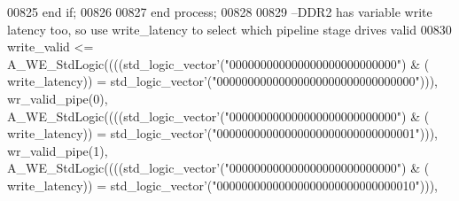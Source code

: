 \begin{DoxyCode}
00825     \textcolor{keywordflow}{end} \textcolor{keywordflow}{if};
00826 
00827   \textcolor{keywordflow}{end} \textcolor{keywordflow}{process};
00828 
00829 \textcolor{keyword}{  --DDR2 has variable write latency too, so use write\_latency to select which pipeline stage drives valid}
00830   \textcolor{vhdlchar}{write_valid} \textcolor{vhdlchar}{<=} \textcolor{vhdlchar}{A\_WE\_StdLogic}\textcolor{vhdlchar}{(}\textcolor{vhdlchar}{(}\textcolor{vhdlchar}{(}\textcolor{vhdlchar}{(}\textcolor{comment}{std\_logic\_vector}\textcolor{vhdlchar}{'}\textcolor{vhdlchar}{(}\textcolor{vhdllogic}{"000000000000000000000000000"}\textcolor{vhdlchar}{)} \textcolor{vhdlchar}{&} \textcolor{vhdlchar}{(}\textcolor{vhdlchar}{
      write_latency}\textcolor{vhdlchar}{)}\textcolor{vhdlchar}{)} \textcolor{vhdlchar}{=} \textcolor{comment}{std\_logic\_vector}\textcolor{vhdlchar}{'}\textcolor{vhdlchar}{(}\textcolor{vhdllogic}{"00000000000000000000000000000000"}\textcolor{vhdlchar}{)}\textcolor{vhdlchar}{)}\textcolor{vhdlchar}{)}\textcolor{vhdlchar}{,} \textcolor{vhdlchar}{
      wr_valid_pipe}\textcolor{vhdlchar}{(}\textcolor{vhdllogic}{}\textcolor{vhdllogic}{0}\textcolor{vhdlchar}{)}\textcolor{vhdlchar}{,} \textcolor{vhdlchar}{A\_WE\_StdLogic}\textcolor{vhdlchar}{(}\textcolor{vhdlchar}{(}\textcolor{vhdlchar}{(}\textcolor{vhdlchar}{(}\textcolor{comment}{std\_logic\_vector}\textcolor{vhdlchar}{'}\textcolor{vhdlchar}{(}\textcolor{vhdllogic}{"000000000000000000000000000"}\textcolor{vhdlchar}{)} \textcolor{vhdlchar}{&} \textcolor{vhdlchar}{(}\textcolor{vhdlchar}{
      write_latency}\textcolor{vhdlchar}{)}\textcolor{vhdlchar}{)} \textcolor{vhdlchar}{=} \textcolor{comment}{std\_logic\_vector}\textcolor{vhdlchar}{'}\textcolor{vhdlchar}{(}\textcolor{vhdllogic}{"00000000000000000000000000000001"}\textcolor{vhdlchar}{)}\textcolor{vhdlchar}{)}\textcolor{vhdlchar}{)}\textcolor{vhdlchar}{,} \textcolor{vhdlchar}{
      wr_valid_pipe}\textcolor{vhdlchar}{(}\textcolor{vhdllogic}{}\textcolor{vhdllogic}{1}\textcolor{vhdlchar}{)}\textcolor{vhdlchar}{,} \textcolor{vhdlchar}{A\_WE\_StdLogic}\textcolor{vhdlchar}{(}\textcolor{vhdlchar}{(}\textcolor{vhdlchar}{(}\textcolor{vhdlchar}{(}\textcolor{comment}{std\_logic\_vector}\textcolor{vhdlchar}{'}\textcolor{vhdlchar}{(}\textcolor{vhdllogic}{"000000000000000000000000000"}\textcolor{vhdlchar}{)} \textcolor{vhdlchar}{&} \textcolor{vhdlchar}{(}\textcolor{vhdlchar}{
      write_latency}\textcolor{vhdlchar}{)}\textcolor{vhdlchar}{)} \textcolor{vhdlchar}{=} \textcolor{comment}{std\_logic\_vector}\textcolor{vhdlchar}{'}\textcolor{vhdlchar}{(}\textcolor{vhdllogic}{"00000000000000000000000000000010"}\textcolor{vhdlchar}{)}\textcolor{vhdlchar}{)}\textcolor{vhdlchar}{)}\textcolor{vhdlchar}{,} \textcolor{vhdlchar}{
}
\end{DoxyCode}
